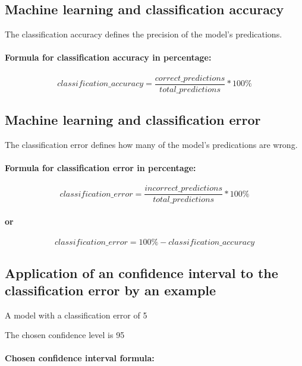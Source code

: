 \documentclass[a4paper,13pt,twoside]{book}
\begin{document}
\subsection{Machine learning and classification accuracy}

The classification accuracy defines the precision of the model's predications.

\paragraph{Formula for classification accuracy in percentage:}

$$
classification\_accuracy =
\frac{correct\_predictions}{total\_predictions}
* 100 \%
$$



\subsection{Machine learning and classification error}

The classification error defines how many of the model's predications are wrong.

\paragraph{Formula for classification error in percentage:}

$$
classification\_error =
\frac{incorrect\_predictions}{total\_predictions}
* 100 \%
$$

\paragraph{or}

$$
classification\_error =
100 \% - classification\_accuracy
$$



\subsection{Application of an confidence interval to the classification error by an example}

A model with a classification error of 5%

The chosen confidence level is 95%

\paragraph{Chosen confidence interval formula:}
\end{document}
